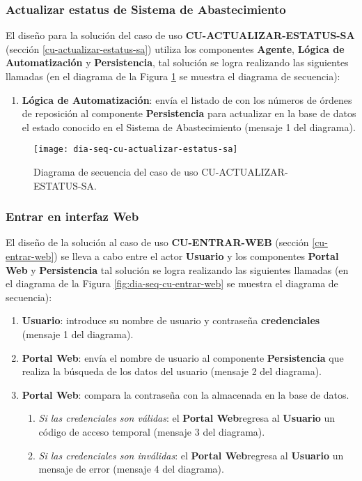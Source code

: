 \subsubsection{Actualizar estatus de Sistema de Abastecimiento}
El diseño para la solución del caso de uso \textbf{CU-ACTUALIZAR-ESTATUS-SA} (sección \ref{cu-actualizar-estatus-sa}) utiliza los componentes \textbf{Agente}, \textbf{Lógica de Automatización} y \textbf{Persistencia}, tal solución se logra realizando las siguientes llamadas (en el diagrama de la Figura \ref{fig:dia-seq-cu-actualizar-estatus-sa} se muestra el diagrama de secuencia):
\begin{enumerate}
	\item \textbf{Lógica de Automatización}: envía el listado de con los números de órdenes de reposición al componente \textbf{Persistencia} para actualizar en la base de datos el estado conocido en el Sistema de Abastecimiento (mensaje 1 del diagrama).
\end{enumerate}

\begin{figure}[h]
	\centering
	\texttt{[image: dia-seq-cu-actualizar-estatus-sa]}
	\caption{Diagrama de secuencia del caso de uso CU-ACTUALIZAR-ESTATUS-SA.}
	\label{fig:dia-seq-cu-actualizar-estatus-sa}
\end{figure}

\subsubsection{Entrar en interfaz Web}
El diseño de la solución al caso de uso \textbf{CU-ENTRAR-WEB} (sección \ref{cu-entrar-web}) se lleva a cabo entre el actor \textbf{Usuario} y los componentes \textbf{Portal Web} y \textbf{Persistencia} tal solución se logra realizando las siguientes llamadas (en el diagrama de la Figura \ref{fig:dia-seq-cu-entrar-web} se muestra el diagrama de secuencia):
\begin{enumerate}
	\item \textbf{Usuario}: introduce su nombre de usuario y contraseña \textbf{credenciales} (mensaje 1 del diagrama).
	\item \textbf{Portal Web}: envía el nombre de usuario al componente \textbf{Persistencia} que realiza la búsqueda de los datos del usuario (mensaje 2 del diagrama).
	\item \textbf{Portal Web}: compara la contraseña con la almacenada en la base de datos.
	\begin{enumerate}
		\item \textit{Si las credenciales son válidas}: el \textbf{Portal Web}regresa al \textbf{Usuario} un código de acceso temporal (mensaje 3 del diagrama).
		\item \textit{Si las credenciales son inválidas}: el \textbf{Portal Web}regresa al \textbf{Usuario} un mensaje de error (mensaje 4 del diagrama).
	\end{enumerate}
\end{enumerate}

